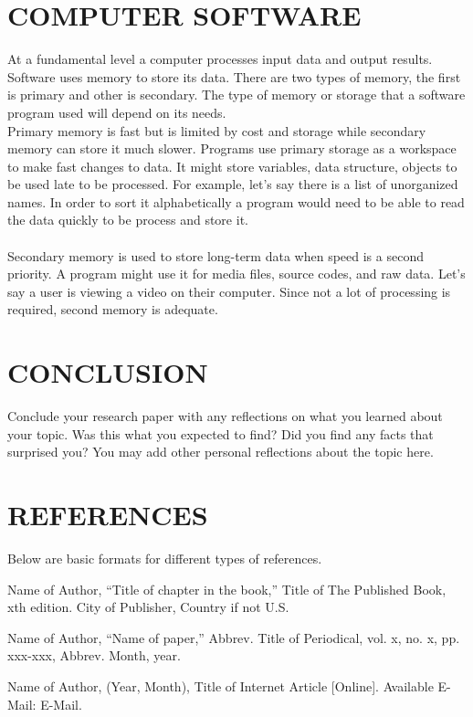 \documentclass[letterpaper, 10 pt, conference]{IEEEconf}
\begin{document}
\section{COMPUTER SOFTWARE}

At a fundamental level a computer processes input data and output results. Software uses memory to store its data. There are two types of memory, the first is primary and other is secondary. The type of memory or storage that a software program used will depend on its needs.\\

Primary memory is fast but is limited by cost and storage while secondary memory can store it much slower. 
Programs use primary storage as a workspace to make fast changes to data. It might store variables, data structure, objects to be used late to be processed. 
For example, let's say there is a list of unorganized names. In order to sort it alphabetically a program would need to be able to read the data quickly to be process and store it.\\

\\Secondary memory is used to store long-term data when speed is a second priority. A program might use it for media files, source codes, and raw data. Let’s say a user is viewing a video on their computer. Since not a lot of processing is required, second memory is adequate.  

\section{CONCLUSION}

Conclude your research paper with any reflections on what you
learned about your topic. Was this what you expected to find?
Did you find any facts that surprised you? You may add other
personal reflections about the topic here.

\section*{REFERENCES}

Below are basic formats for different types of references.

\begin{enumerate}[label={[\arabic*]}]
\item Name of Author, ``Title of chapter in the book,''
Title of The Published Book, xth edition. City of
Publisher, Country if not U.S.
\item Name of Author, “Name of paper,” Abbrev.
Title of Periodical, vol. x, no. x, pp. xxx-xxx,
Abbrev. Month, year.
\item Name of Author, (Year, Month),
Title of Internet Article [Online]. Available E-Mail:
E-Mail.
\end{enumerate}
\end{document}
